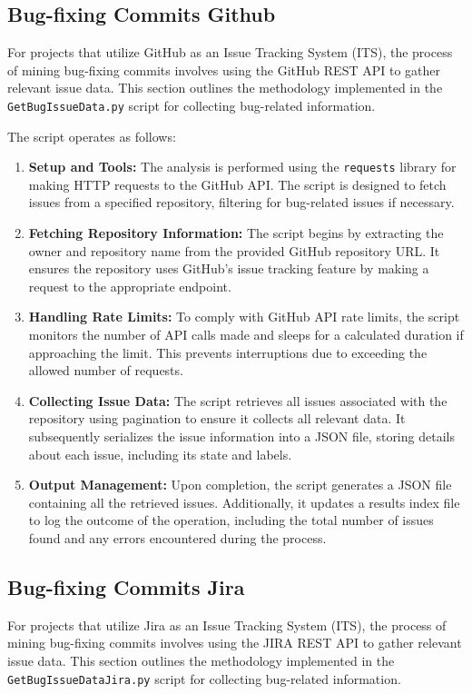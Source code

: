 \documentclass[sigconf]{acmart}
\begin{document}
\subsection{Bug-fixing Commits Github}
For projects that utilize GitHub as an Issue Tracking System (ITS), the process of mining bug-fixing commits involves using the GitHub REST API to gather relevant issue data. This section outlines the methodology implemented in the \texttt{GetBugIssueData.py} script for collecting bug-related information.

The script operates as follows:

\begin{enumerate}
    \item \textbf{Setup and Tools:} The analysis is performed using the \texttt{requests} library for making HTTP requests to the GitHub API. The script is designed to fetch issues from a specified repository, filtering for bug-related issues if necessary.

    \item \textbf{Fetching Repository Information:} The script begins by extracting the owner and repository name from the provided GitHub repository URL. It ensures the repository uses GitHub's issue tracking feature by making a request to the appropriate endpoint.

    \item \textbf{Handling Rate Limits:} To comply with GitHub API rate limits, the script monitors the number of API calls made and sleeps for a calculated duration if approaching the limit. This prevents interruptions due to exceeding the allowed number of requests.

    \item \textbf{Collecting Issue Data:} The script retrieves all issues associated with the repository using pagination to ensure it collects all relevant data. It subsequently serializes the issue information into a JSON file, storing details about each issue, including its state and labels.

    \item \textbf{Output Management:} Upon completion, the script generates a JSON file containing all the retrieved issues. Additionally, it updates a results index file to log the outcome of the operation, including the total number of issues found and any errors encountered during the process.
\end{enumerate}

\subsection{Bug-fixing Commits Jira}
For projects that utilize Jira as an Issue Tracking System (ITS), the process of mining bug-fixing commits involves using the JIRA REST API to gather relevant issue data. This section outlines the methodology implemented in the \texttt{GetBugIssueDataJira.py} script for collecting bug-related information.
\end{document}
